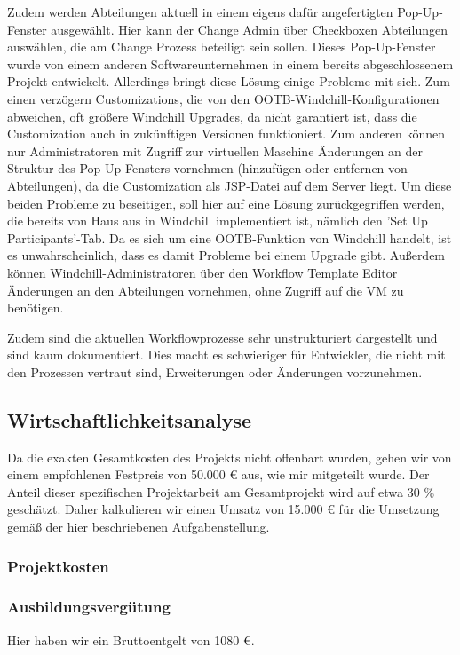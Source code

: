 Zudem werden Abteilungen aktuell in einem eigens dafür angefertigten Pop-Up-Fenster ausgewählt.
Hier kann der Change Admin über Checkboxen Abteilungen auswählen, die am Change Prozess beteiligt sein sollen.
Dieses Pop-Up-Fenster wurde von einem anderen Softwareunternehmen in einem bereits abgeschlossenem Projekt entwickelt.
Allerdings bringt diese Lösung einige Probleme mit sich.
Zum einen verzögern Customizations, die von den OOTB-Windchill-Konfigurationen abweichen, oft größere Windchill Upgrades, da nicht garantiert ist, dass die Customization auch in zukünftigen Versionen funktioniert.
Zum anderen können nur Administratoren mit Zugriff zur virtuellen Maschine Änderungen an der Struktur des Pop-Up-Fensters vornehmen (\zB hinzufügen oder entfernen von Abteilungen), da die Customization als JSP-Datei auf dem Server liegt.
Um diese beiden Probleme zu beseitigen, soll hier auf eine Lösung zurückgegriffen werden, die bereits von Haus aus in Windchill implementiert ist, nämlich den 'Set Up Participants'-Tab.
Da es sich um eine OOTB-Funktion von Windchill handelt, ist es unwahrscheinlich, dass es damit Probleme bei einem Upgrade gibt.
Außerdem können Windchill-Administratoren über den Workflow Template Editor Änderungen an den Abteilungen vornehmen, ohne Zugriff auf die VM zu benötigen.

Zudem sind die aktuellen Workflowprozesse sehr unstrukturiert dargestellt und sind kaum dokumentiert.
Dies macht es schwieriger für Entwickler, die nicht mit den Prozessen vertraut sind, Erweiterungen oder Änderungen vorzunehmen.
\subsection{Wirtschaftlichkeitsanalyse}
\label{sec:Wirtschaftlichkeitsanalyse}

Da die exakten Gesamtkosten des Projekts nicht offenbart wurden, gehen wir von einem empfohlenen Festpreis von 50.000 € aus, wie mir mitgeteilt wurde. %
Der Anteil dieser spezifischen Projektarbeit am Gesamtprojekt wird auf etwa 30 \% geschätzt.
Daher kalkulieren wir einen Umsatz von 15.000 € für die Umsetzung gemäß der hier beschriebenen Aufgabenstellung.

\subsubsection{Projektkosten}
\subsubsection*{Ausbildungsvergütung}
Hier haben wir ein Bruttoentgelt von 1080 €.

